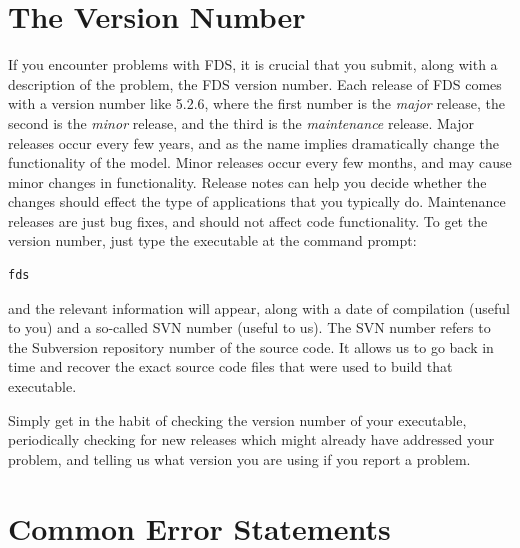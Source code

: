\documentclass[11pt]{book}
\begin{document}
\section{The Version Number}

If you encounter problems with FDS, it is crucial that you submit, along with a description of the problem, the FDS version number. Each release of
FDS comes with a version number like 5.2.6, where the first number is the {\em major} release, the second is the {\em minor} release, and the
third is the {\em maintenance} release. Major releases occur every few years, and as the name implies dramatically change the functionality of the model.
Minor releases occur every few months, and may cause minor changes in functionality. Release notes can help you decide whether the changes should effect the
type of applications that you typically do. Maintenance releases are just bug fixes, and should not affect code functionality. To get the version number, just
type the executable at the command prompt:
\begin{verbatim}
fds
\end{verbatim}
and the relevant information will appear, along with a date of compilation (useful to you) and a so-called SVN number (useful to us).  The SVN number refers to
the Subversion repository number of the source code. It allows us to go back in time and recover the exact source code files
that were used to build that executable.

Simply get in the habit of checking the version number of your executable, periodically checking for new releases which
might already have addressed your problem, and telling us what version you are using if you report a problem.





\section{Common Error Statements}
\end{document}
